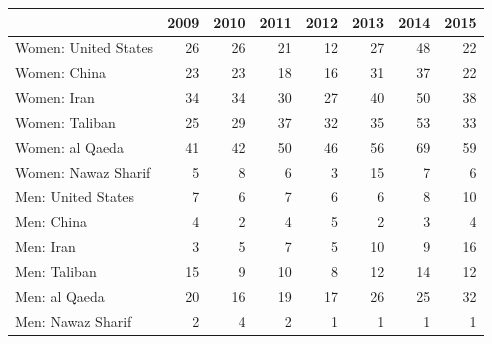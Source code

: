 \begin{tabular}{lrrrrrrr}
\toprule
 & 2009 & 2010 & 2011 & 2012 & 2013 & 2014 & 2015 \\
\midrule
Women: United States & 26 & 26 & 21 & 12 & 27 & 48 & 22 \\
Women: China & 23 & 23 & 18 & 16 & 31 & 37 & 22 \\
Women: Iran & 34 & 34 & 30 & 27 & 40 & 50 & 38 \\
Women: Taliban & 25 & 29 & 37 & 32 & 35 & 53 & 33 \\
Women: al Qaeda & 41 & 42 & 50 & 46 & 56 & 69 & 59 \\
Women: Nawaz Sharif & 5 & 8 & 6 & 3 & 15 & 7 & 6 \\
\midrule
Men: United States & 7 & 6 & 7 & 6 & 6 & 8 & 10 \\
Men: China & 4 & 2 & 4 & 5 & 2 & 3 & 4 \\
Men: Iran & 3 & 5 & 7 & 5 & 10 & 9 & 16 \\
Men: Taliban & 15 & 9 & 10 & 8 & 12 & 14 & 12 \\
Men: al Qaeda & 20 & 16 & 19 & 17 & 26 & 25 & 32 \\
Men: Nawaz Sharif & 2 & 4 & 2 & 1 & 1 & 1 & 1 \\
\bottomrule
\end{tabular}
